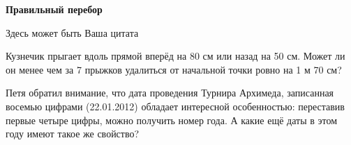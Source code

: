 \centerline{\bf \Huge Правильный перебор}

\begin{flushright}
        \scriptsize{Здесь может быть Ваша цитата}
\end{flushright}

 Кузнечик прыгает вдоль прямой вперёд на 80 см
или назад на 50 см. Может ли он менее чем за 7 прыжков удалиться от начальной точки ровно
на 1 м 70 см?

 Петя обратил внимание, что дата проведения Турнира Архимеда, записанная восемью цифрами (22.01.2012) обладает интересной особенностью: переставив
первые четыре цифры, можно получить номер года. А какие ещё даты в этом году имеют такое
же свойство?

